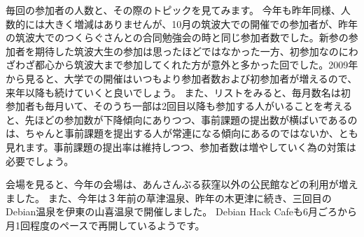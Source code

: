\documentclass[mingoth,a4paper]{jsarticle}
\begin{document}
毎回の参加者の人数と、その際のトピックを見てみます。
今年も昨年同様、人数的には大きく増減はありませんが、10月の筑波大での開催での参加者が、昨年の筑波大でのつくらぐさんとの合同勉強会の時と同じ参加者数でした。新参の参加者を期待した筑波大生の参加は思ったほどではなかった一方、初参加なのにわざわざ都心から筑波大まで参加してくれた方が意外と多かった回でした。2009年から見ると、大学での開催はいつもより参加者数および初参加者が増えるので、来年以降も続けていくと良いでしょう。
また、リストをみると、毎月数名は初参加者も毎月いて、そのうち一部は2回目以降も参加する人がいることを考えると、先ほどの参加数が下降傾向にありつつ、事前課題の提出数が横ばいであるのは、ちゃんと事前課題を提出する人が常連になる傾向にあるのではないか、とも見れます。事前課題の提出率は維持しつつ、参加者数は増やしていく為の対策は必要でしょう。


会場を見ると、今年の会場は、あんさんぶる荻窪以外の公民館などの利用が増えました。
また、今年は３年前の草津温泉、昨年の木更津に続き、三回目のDebian温泉を伊東の山喜温泉で開催しました。
Debian Hack Cafeも6月ごろから月1回程度のペースで再開しているようです。
\end{document}
